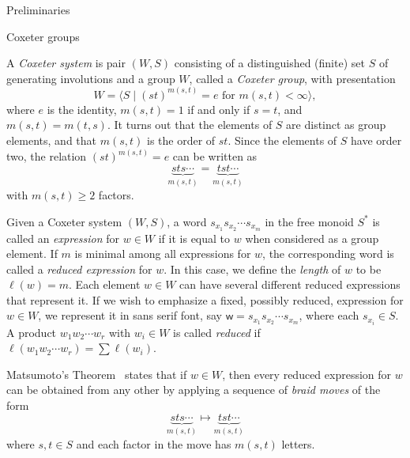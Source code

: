 \documentclass[11pt]{amsart}
\theoremstyle{definition}
\numberwithin{equation}{section}
\newcommand{\supp}{\mathrm{supp}}
\renewcommand{\(}{\left(}
\renewcommand{\)}{\right)}
\newcommand{\w}{\mathsf{w}}
\begin{document}

\begin{section}{Preliminaries}\label{sec:prelim}


\begin{subsection}{Coxeter groups}\label{subsec:coxeter groups}

A \emph{Coxeter system} is pair $(W,S)$ consisting of a distinguished (finite) set $S$ of generating involutions and a group $W$, called a \emph{Coxeter group}, with presentation
\[
W = \langle S \mid (st)^{m(s, t)} = e \text{ for } m(s, t) < \infty \rangle,
\]
where $e$ is the identity, $m(s,t) = 1$ if and only if $s = t$, and $m(s,t) = m(t,s)$. It turns out that the elements of $S$ are distinct as group elements, and that $m(s, t)$ is the order of $st$.  Since the elements of $S$ have order two, the relation $(st)^{m(s,t)} = e$ can be written as
\[
\underbrace{sts \cdots}_{m(s,t)} = \underbrace{tst \cdots}_{m(s,t)}
\]
with $m(s,t) \geq 2$ factors.

Given a Coxeter system $(W,S)$, a word $s_{x_1}s_{x_2}\cdots s_{x_m}$ in the free monoid $S^*$ is called an \emph{expression} for $w\in W$ if it is equal to $w$ when considered as a group element. If $m$ is minimal among all expressions for $w$, the corresponding word is called a \emph{reduced expression} for $w$. In this case, we define the \emph{length} of $w$ to be $\ell(w)=m$. Each element $w \in W$ can have several different reduced expressions that represent it.  If we wish to emphasize a fixed, possibly reduced, expression for $w\in W$, we represent it  in \textsf{sans serif} font, say $\w=s_{x_1}s_{x_2}\cdots s_{x_m}$, where each $s_{x_i} \in S$.  A product $w_{1}w_{2}\cdots w_{r}$ with $w_{i} \in W$ is called \emph{reduced} if $\ell(w_{1}w_{2}\cdots w_{r})=\sum \ell(w_{i})$.  

Matsumoto's Theorem~\cite[Theorem 1.2.2]{Geck2000} states that if $w \in W$, then every reduced expression for $w$ can be obtained from any other by applying a sequence of \emph{braid moves} of the form 
\[
{\underbrace{sts \cdots }_{m(s,t)} } \mapsto {\underbrace{tst \cdots}_{m(s,t)}}
\]
where $s,t \in S$ and each factor in the move has $m(s,t)$ letters.  %



\end{subsection}
\end{section}
\end{document}
